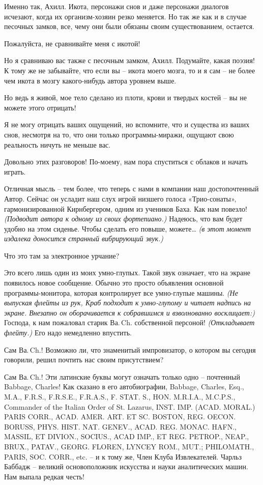 \documentclass[../main.tex]{subfiles}
\begin{document}
\begin{dialogue}
 Именно так, Ахилл. Икота, персонажи снов и даже персонажи диалогов исчезают, когда их организм-хозяин резко меняется. Но так же как и в случае песочных замков, все, чему они были обязаны своим существованием, остается.

 Пожалуйста, не сравнивайте меня с икотой!

 Но я сравниваю вас также с песочным замком, Ахилл. Подумайте, какая поэзия! К тому же не забывайте, что если вы \--- икота моего мозга, то и я сам \--- не более чем икота в мозгу какого-нибудь автора уровнем выше.

 Но ведь я живой, мое тело сделано из плоти, крови и твердых костей \--- вы не можете этого отрицать!

 Я не могу отрицать ваших ощущений, но вспомните, что и существа из ваших снов, несмотря на то, что они только программы-миражи, ощущают свою реальность ничуть не меньше вас.

 Довольно этих разговоров! По-моему, нам пора спуститься с облаков и начать играть.

 Отличная мысль \--- тем более, что теперь с нами в компании наш достопочтенный Автор. Сейчас он усладит наш слух игрой низшего голоса «Трио-сонаты», гармонизированной Кирнбергером, одним из учеников Баха. Как нам повезло! \emph{(Подводит автора к одному из своих фортепиано.)} Надеюсь, что вам будет удобно на этом сиденье. Чтобы сделать его повыше, можете\ldots{} \emph{(в этот момент издалека доносится странный вибрирующий звук.)}

 Что это там за электронное урчание?

 Это всего лишь один из моих умно-глупых. Такой звук означает, что на экране появилось новое сообщение. Обычно это просто объявления основной программы-монитора, которая контролирует все умно-глупые машины. \emph{(Не выпуская флейты из рук, Краб подходит к умно-глупому и читает надпись на экране. Внезапно он оборачивается к собравшимся и взволнованно восклицает:)} Господа, к нам пожаловал старик Ва.\,Ch. собственной персоной! \emph{(Откладывает флейту.)} Его надо немедленно впустить.

 Сам Ва.\,Ch.! Возможно ли, что знаменитый импровизатор, о котором вы сегодня говорили, решил почтить нас своим присутствием?

 Сам Ва.\,Ch.! Эти латинские буквы могут означать только одно \--- почтенный Babbage, Charles! Как сказано в его автобиографии, Babbage, Charles, Esq., M.A., F.R.S., F.R.S.E., F.R.A.S., F. STAT. S., HON. M.R.I.A., M.C.P.S., Commander of the Italian Order of St. Lazarus, INST. IMP. (ACAD. MORAL.) PARIS CORR., ACAD. AMER. ART. ET SC. BOSTON, REG. OECON. BORUSS, PHYS. HIST. NAT. GENEV., ACAD. REG. MONAC. HAFN., MASSIL, ET DIVION., SOCIUS., ACAD IMP., ET REG. PETROP., NEAP., BRUX., PATAV., GEORG. FLOREN, LYNCEY ROM., MUT.; PHILOMATH., PARIS, SOC. CORR., etc. \--- и к тому же, Член Клуба Извлекателей. Чарльз Баббадж \--- великий основоположник искусства и науки аналитических машин. Нам выпала редкая честь!


\end{dialogue}
\end{document}
